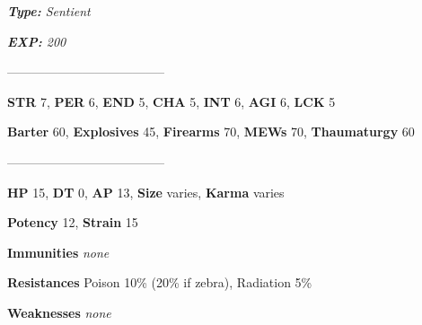 \documentclass[11pt,a4paper,twocolumn]{book}
\begin{document}
	\noindent
	\emph{\textbf{Type:} Sentient}
	
	\noindent
	\emph{\textbf{EXP:} 200}
	
%		
%	
%		

	--------------------------------------

	\noindent
	\textbf{STR} 7, \textbf{PER} 6, \textbf{END} 5, \textbf{CHA} 5, \textbf{INT} 6, \textbf{AGI} 6, \textbf{LCK} 5
	
	\noindent
	\textbf{Barter} 60, \textbf{Explosives} 45,  \textbf{Firearms} 70, \textbf{MEWs} 70, \textbf{Thaumaturgy} 60
	
	--------------------------------------
	
	\noindent
	\textbf{HP} 15, \textbf{DT} 0, \textbf{AP} 13, \textbf{Size} varies, \textbf{Karma} varies
	
	\noindent
	\textbf{Potency} 12, \textbf{Strain} 15
	
	\noindent
	\textbf{Immunities} \emph{none} %
	
	\noindent
	\textbf{Resistances} Poison 10\% (20\% if zebra), Radiation 5\%%
	
	\noindent
	\textbf{Weaknesses} \emph{none}%
	
\end{document}
